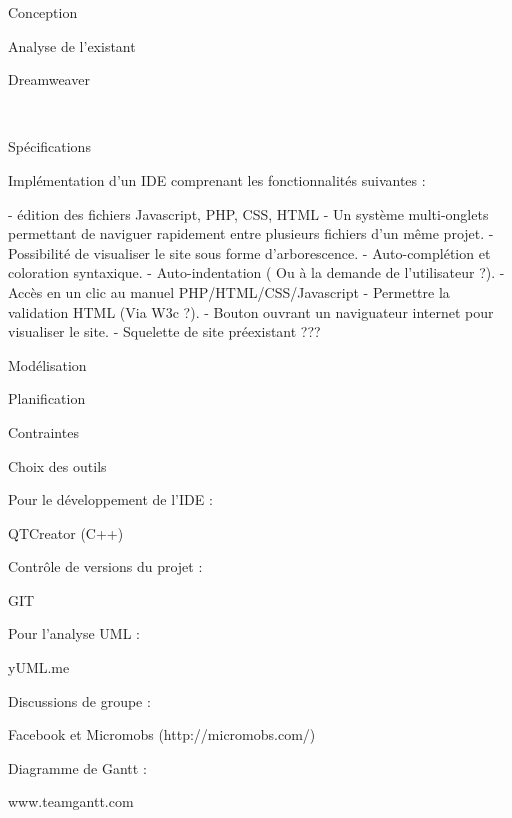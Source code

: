 \documentclass[a4paper, 12pt]{report}
\begin{document}
\begin{part}{Conception}
\begin{chapter}{Analyse de l'existant}
\begin{section}{Dreamweaver}
			\end{section}
			~\\
		\end{chapter}
		\begin{chapter}{Spécifications}
				
				Implémentation d'un IDE comprenant les fonctionnalités suivantes :

				- édition des fichiers Javascript, PHP, CSS, HTML
				- Un système multi-onglets permettant de naviguer rapidement entre plusieurs fichiers d'un même projet.
				- Possibilité de visualiser le site sous forme d'arborescence.
				- Auto-complétion et coloration syntaxique. 
				- Auto-indentation ( Ou à la demande de l'utilisateur ?).
				- Accès en un clic au manuel PHP/HTML/CSS/Javascript
				- Permettre la validation HTML (Via W3c ?).
				- Bouton ouvrant un naviguateur internet pour visualiser le site.
				- Squelette de site préexistant ???
			~\\
		\end{chapter}
		\begin{chapter}{Modélisation}
		\end{chapter}
	\end{part}
	\begin{part}{Planification}
		\begin{chapter}{Contraintes}
		\end{chapter}
		\begin{chapter}{Choix des outils}

			Pour le développement de l'IDE :

			QTCreator (C++)

			Contrôle de versions du projet :

			GIT

			Pour l'analyse UML :

			yUML.me

			Discussions de groupe :

			Facebook et Micromobs (http://micromobs.com/)

			Diagramme de Gantt :

			www.teamgantt.com




		\end{chapter}
	\end{part}
\end{document}
